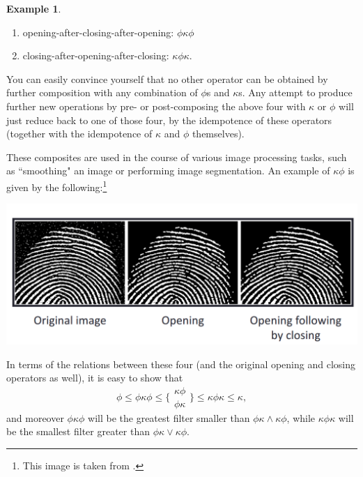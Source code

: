 \documentclass[11pt]{book}
\theoremstyle{definition}
\newtheorem{example}{Example}[section]
\theoremstyle{definition}
\theoremstyle{definition}
\theoremstyle{theorem}
\theoremstyle{definition}
\begin{document}
\begin{example}
\begin{enumerate}
		\item opening-after-closing-after-opening: $ \phi \kappa \phi$
		\item closing-after-opening-after-closing: $\kappa \phi \kappa$.
	\end{enumerate} 
	You can easily convince yourself that no other operator can be obtained by further composition with any combination of $\phi$s and $\kappa$s. Any attempt to produce further new operations by pre- or post-composing the above four with $\kappa$ or $\phi$ will just reduce back to one of those four, by the idempotence of these operators (together with the idempotence of $\kappa$ and $\phi$ themselves). \par 
	These composites are used in the course of various image processing tasks, such as ``smoothing" an image or performing image segmentation. An example of $\kappa \phi$ is given by the following:\footnote{This image is taken from \cite{bobick_binary_2014}.}
	\begin{center}
		\includegraphics*[scale=0.25]{FingerprintExample.png}
	\end{center}
	In terms of the relations between these four (and the original opening and closing operators as well), it is easy to show that 
	\begin{equation*}
	\phi \leq \phi \kappa \phi \leq \{ \begin{smallmatrix}
	\kappa \phi \\ 
	\phi \kappa 
	\end{smallmatrix} \} \leq \kappa \phi \kappa \leq \kappa,  
	\end{equation*}
	and moreover $\phi \kappa \phi$ will be the greatest filter smaller than $\phi \kappa \wedge \kappa \phi$, while $\kappa \phi \kappa$ will be the smallest filter greater than $\phi \kappa \vee \kappa \phi$.
\end{example} 
\end{document}
